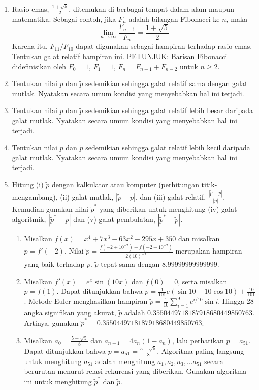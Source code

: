 \begin{enumerate}
\begin{enumerate}
\item ${\displaystyle \sum_{n=0}^{5}\frac{1}{n!}}$
\item ${\displaystyle \sum_{n=0}^{10}\frac{1}{n!}}$
\end{enumerate}
\item Rasio emas, ${\displaystyle \frac{1+\sqrt{5}}{2}}$, ditemukan di
berbagai tempat dalam alam maupun matematika. Sebagai contoh, jika
$F_{n}$ adalah bilangan Fibonacci ke-$n$, maka
\[
\lim_{n\to\infty}\frac{F_{n+1}}{F_{n}}=\frac{1+\sqrt{5}}{2}
\]
Karena itu, $F_{11}/F_{10}$ dapat digunakan sebagai hampiran terhadap
rasio emas. Tentukan galat relatif hampiran ini. PETUNJUK: Barisan
Fibonacci didefinisikan oleh $F_{0}=1$, $F_{1}=1$, $F_{n}=F_{n-1}+F_{n-2}$
untuk $n\geq2$.
\item \label{exc:abserr9}Tentukan nilai $p$ dan $\tilde{p}$ sedemikian
sehingga galat relatif sama dengan galat mutlak. Nyatakan secara umum
kondisi yang menyebabkan hal ini terjadi. \hasananswer 
\item Tentukan nilai $p$ dan $\tilde{p}$ sedemikian sehingga galat relatif
lebih besar daripada galat mutlak. Nyatakan secara umum kondisi yang
menyebabkan hal ini terjadi.
\item Tentukan nilai $p$ dan $\tilde{p}$ sedemikian sehingga galat relatif
lebih kecil daripada galat mutlak. Nyatakan secara umum kondisi yang
menyebabkan hal ini terjadi.
\item Hitung (i) $\tilde{p}$ dengan kalkulator atau komputer (perhitungan
titik-mengambang), (ii) galat mutlak, $|\tilde{p}-p|$, dan (iii)
galat relatif, $\frac{|\tilde{p}-p|}{|p|}$. Kemudian gunakan nilai
$\tilde{p}^{*}$ yang diberikan untuk menghitung (iv) galat algoritmik,
$|\tilde{p}^{*}-p|$ dan (v) galat pembulatan, $|\tilde{p}^{*}-\tilde{p}|$.

\begin{enumerate}
\item \label{exc:abserr10}Misalkan $f(x)=x^{4}+7x^{3}-63x^{2}-295x+350$
dan misalkan $p=f'(-2)$. Nilai $\tilde{p}=\frac{f(-2+10^{-7})-f(-2-10^{-7})}{2(10)^{-7}}$
merupakan hampiran yang baik terhadap $p$. $\tilde{p}$ tepat sama
dengan $8.99999999999999$. \hasananswer 
\item Misalkan $f'(x)=e^{x}\sin(10x)$ dan $f(0)=0$, serta misalkan $p=f(1)$.
Dapat ditunjukkan bahwa $p=\frac{1}{101}e(\sin10-10\cos10)+\frac{10}{101}$.
Metode Euler menghasilkan hampiran $\tilde{p}=\frac{1}{10}\sum_{i=1}^{9}e^{i/10}\sin i$.
Hingga 28 angka signifikan yang akurat, $\tilde{p}$ adalah $0.3550449718187918680449850763$.
Artinya, gunakan $\tilde{p}^{*}=0.3550449718187918680449850763$.
\item Misalkan $a_{0}=\frac{5+\sqrt{5}}{8}$ dan $a_{n+1}=4a_{n}(1-a_{n})$,
lalu perhatikan $p=a_{51}$. Dapat ditunjukkan bahwa $p=a_{51}=\frac{5-\sqrt{5}}{8}$.
Algoritma paling langsung untuk menghitung $a_{51}$ adalah menghitung
$a_{1},a_{2},a_{3},\ldots a_{51}$ secara berurutan menurut relasi
rekurensi yang diberikan. Gunakan algoritma ini untuk menghitung $\tilde{p}^{*}$
dan $\tilde{p}$.
\end{enumerate}
\end{enumerate}
\finishexercises 

